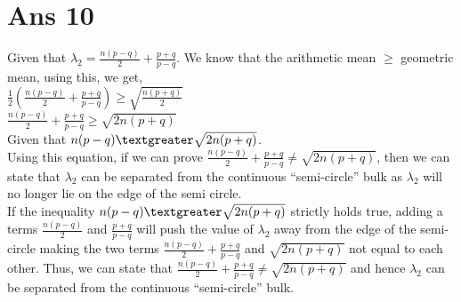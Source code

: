 \documentclass[10pt]{article}
\begin{document}
\section*{Ans 10}
\begin{flushleft}
Given that $\lambda_{2} = \frac{n(p-q)}{2}+\frac{p+q}{p-q}$. We know that the arithmetic mean $\geq$ geometric mean, using this, we get,\\
\vspace{0.5em}
$\frac{1}{2} (\frac{n(p-q)}{2}+\frac{p+q}{p-q}) \geq \sqrt{\frac{n(p+q)}{2}}$\\
\vspace{0.5em}
$\frac{n(p-q)}{2}+\frac{p+q}{p-q} \geq \sqrt{2n(p+q)}$\\
\vspace{0.5em}
Given that $n(p-q) \textgreater \sqrt{2n(p+q)}$.\\
\vspace{0.5em}
Using this equation, if we can prove $\frac{n(p-q)}{2}+\frac{p+q}{p-q} \neq \sqrt{2n(p+q)}$, then we can state that $\lambda_{2}$ can be separated from the continuous ``semi-circle'' bulk as $\lambda_{2}$ will no longer lie on the edge of the semi circle.\\
\vspace{0.5em}
If the inequality $n(p-q) \textgreater \sqrt{2n(p+q)}$ strictly holds true, adding a terms $\frac{n(p-q)}{2}$ and $\frac{p+q}{p-q}$ will push the value of $\lambda_{2}$ away from the edge of the semi-circle making the two terms $\frac{n(p-q)}{2}+\frac{p+q}{p-q}$ and $\sqrt{2n(p+q)}$ not equal to each other. Thus, we can state that $\frac{n(p-q)}{2}+\frac{p+q}{p-q} \neq \sqrt{2n(p+q)}$ and hence $\lambda_{2}$ can be separated from the continuous ``semi-circle'' bulk.
\end{flushleft}
\end{document}
